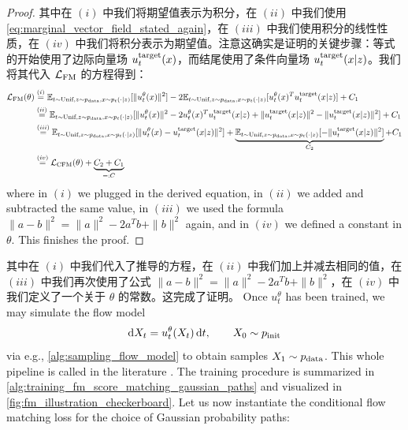 \begin{proof}
其中在 $(i)$ 中我们将期望值表示为积分，在 $(ii)$ 中我们使用\cref{eq:marginal_vector_field_stated_again}，在 $(iii)$ 中我们使用积分的线性性质，在 $(iv)$ 中我们将积分表示为期望值。注意这确实是证明的关键步骤：等式的开始使用了边际向量场 $u^{\text{target}}_t(x)$，而结尾使用了条件向量场 $u^{\text{target}}_t(x|z)$。我们将其代入 $\mathcal{L}_{\text{FM}}$ 的方程得到：
\begin{align*}
\mathcal{L}_{\text{FM}}(\theta)&\overset{(i)}{=}\mathbb{E}_{t\sim\text{Unif},z\sim p_{\rm{data}}, x\sim p_t(\cdot|z)}[\|u_t^\theta(x)\|^2]-2\mathbb{E}_{t\sim\text{Unif},z\sim p_{\rm{data}}, x\sim p_t(\cdot|z)}[u_t^\theta(x)^Tu^{\text{target}}_t(x|z)] +C_1\\
&\overset{(ii)}{=}\mathbb{E}_{t\sim\text{Unif},z\sim p_{\rm{data}}, x\sim p_t(\cdot|z)}[\|u_t^\theta(x)\|^2-2u_t^\theta(x)^Tu^{\text{target}}_t(x|z)+\|u^{\text{target}}_t(x|z)\|^2-\|u^{\text{target}}_t(x|z)\|^2] +C_1\\
&\overset{(iii)}{=}\mathbb{E}_{t\sim\text{Unif},z\sim p_{\rm{data}}, x\sim p_t(\cdot|z)}[\|u_t^\theta(x)-u^{\text{target}}_t(x|z)\|^2]+\underbrace{\mathbb{E}_{t\sim\text{Unif},z\sim p_{\rm{data}}, x\sim p_t(\cdot|z)}[-\|u^{\text{target}}_t(x|z)\|^2]}_{C_2} +C_1\\
&\overset{(iv)}{=}\mathcal{L}_{\text{CFM}}(\theta) + \underbrace{C_2+C_1}_{=:C}
\end{align*}
where in $(i)$ we plugged in the derived equation, in $(ii)$ we added and subtracted the same value,  in $(iii)$ we used the formula $\|a-b\|^2=\|a\|^2-2a^Tb+\|b\|^2$ again, and in $(iv)$ we defined a constant in $\theta$. This finishes the proof.
\end{proof}

其中在 $(i)$ 中我们代入了推导的方程，在 $(ii)$ 中我们加上并减去相同的值，在 $(iii)$ 中我们再次使用了公式 $\|a-b\|^2=\|a\|^2-2a^Tb+\|b\|^2$，在 $(iv)$ 中我们定义了一个关于 $\theta$ 的常数。这完成了证明。
Once $u_t^{\theta}$ has been trained, we may simulate the flow model
\begin{align}
\label{eq:sde_extension_restated}
    \mathrm{d} X_t = u_t^\theta(X_t)\, \mathrm{d} t,\quad\quad X_0\sim p_{\rm{init}}
\end{align}
via e.g., \cref{alg:sampling_flow_model} to obtain samples $X_1\sim p_{\rm{data}}$. This whole pipeline is called  in the literature \citep{lipman2022flow, liu2022flow, albergo2023stochastic, lipman2024flow}. The training procedure is summarized in \cref{alg:training_fm_score_matching_gaussian_paths} and visualized in \cref{fig:fm_illustration_checkerboard}. Let us now instantiate the conditional flow matching loss for the choice of Gaussian probability paths:

